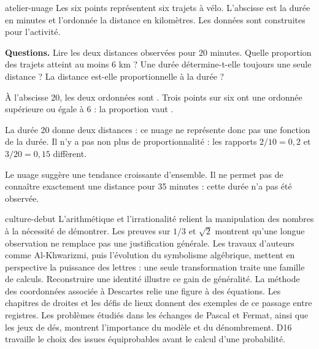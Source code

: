 \begin{blocEdition}{atelier-nuage}
Les six points représentent six trajets à vélo. L’abscisse est la durée en minutes et l’ordonnée la distance en kilomètres. Les données sont construites pour l’activité.
\par\medskip
\textbf{Questions.} Lire les deux distances observées pour 20 minutes. Quelle proportion des trajets atteint au moins 6 km ? Une durée détermine-t-elle toujours une seule distance ? La distance est-elle proportionnelle à la durée ?
\label{fig-atelier-nuage}

À l’abscisse 20, les deux ordonnées sont . Trois points sur six ont une ordonnée supérieure ou égale à 6 : la proportion vaut .
\par\medskip
La durée 20 donne deux distances : ce nuage ne représente donc pas une fonction de la durée. Il n’y a pas non plus de proportionnalité : les rapports $2/10=0{,}2$ et $3/20=0{,}15$ diffèrent.
\par\medskip
Le nuage suggère une tendance croissante d’ensemble. Il ne permet pas de connaître exactement une distance pour 35 minutes : cette durée n’a pas été observée.
\end{blocEdition}
\begin{blocEdition}{culture-debut}
L’arithmétique et l’irrationalité relient la manipulation des nombres à la nécessité de démontrer. Les preuves sur $1/3$ et $\sqrt2$ montrent qu’une longue observation ne remplace pas une justification générale.
Les travaux d’auteurs comme Al-Khwarizmi, puis l’évolution du symbolisme algébrique, mettent en perspective la puissance des lettres : une seule transformation traite une famille de calculs. Reconstruire une identité illustre ce gain de généralité.
La méthode des coordonnées associée à Descartes relie une figure à des équations. Les chapitres de droites et les défis de lieux donnent des exemples de ce passage entre registres.
Les problèmes étudiés dans les échanges de Pascal et Fermat, ainsi que les jeux de dés, montrent l’importance du modèle et du dénombrement. D16 travaille le choix des issues équiprobables avant le calcul d’une probabilité.
\end{blocEdition}

